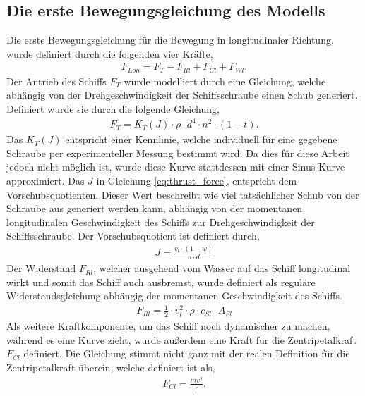 \documentclass[]{iat}
\begin{document}
\subsection{Die erste Bewegungsgleichung des Modells} \label{sec:eom1}
Die erste Bewegungsgleichung für die Bewegung in longitudinaler Richtung, wurde definiert durch die folgenden vier Kräfte,
\begin{align}
    F_{Lon} = F_{T} - F_{Rl} + F_{Cl} + F_{Wl}. \label{eq:longitudinal_force}
\end{align}
Der Antrieb des Schiffs $F_T$ wurde modelliert durch eine Gleichung, welche abhängig von der Drehgeschwindigkeit der Schiffsschraube einen Schub generiert. Definiert wurde sie durch die folgende Gleichung,
\begin{align}
    F_{T} = K_T(J) \cdot \rho \cdot d^4 \cdot n^2 \cdot (1-t). \label{eq:thrust_force}
\end{align}
Das $K_T(J)$ entspricht einer Kennlinie, welche individuell für eine gegebene Schraube per experimenteller Messung bestimmt wird. \cite[]{hydrodynamicsNinova} Da dies für diese Arbeit jedoch nicht möglich ist, wurde diese Kurve stattdessen mit einer Sinus-Kurve approximiert. Das $J$ in Gleichung \ref*{eq:thrust_force}, entspricht dem Vorschubsquotienten. \cite[]{Benedict2007ExplainingSD} Dieser Wert beschreibt wie viel tatsächlicher Schub von der Schraube aus generiert werden kann, abhängig von der momentanen longitudinalen Geschwindigkeit des Schiffs zur Drehgeschwindigkeit der Schiffsschraube. Der Vorschubsquotient ist definiert durch,
\begin{align}
    J = \frac{v_l \cdot (1-w)}{n \cdot d} \label{eq:thrust_coeffcient}
\end{align}
Der Widerstand $F_{Rl}$, welcher ausgehend vom Wasser auf das Schiff longitudinal wirkt und somit das Schiff auch ausbremst, wurde definiert als reguläre Widerstandsgleichung abhängig der momentanen Geschwindigkeit des Schiffs.
\begin{align}
    F_{Rl} = \frac{1}{2} \cdot v_l^2 \cdot \rho \cdot c_{Sl} \cdot A_{Sl} \label{eq:front_resistance}
\end{align}
Als weitere Kraftkomponente, um das Schiff noch dynamischer zu machen, während es eine Kurve zieht, wurde außerdem eine Kraft für die Zentripetalkraft $F_{Cl}$ definiert. Die Gleichung stimmt nicht ganz mit der realen Definition für die Zentripetalkraft überein, welche definiert ist als,
\begin{align}
    F_{Cl} = \frac{mv^2}{r}.
\end{align}
\end{document}
